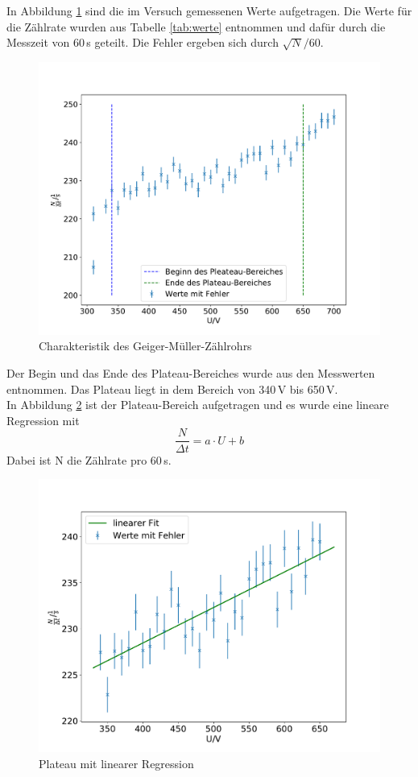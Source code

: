 In Abbildung \ref{fig:char} sind die im Versuch gemessenen Werte aufgetragen.
Die Werte für die Zählrate wurden aus Tabelle \ref{tab:werte} entnommen
und dafür durch die Messzeit von 60\,s geteilt.
Die Fehler ergeben sich durch $\sqrt{N}/60$.\\
\begin{figure}
  \centering
  \includegraphics[scale=0.7]{plateau.pdf}
  \caption{Charakteristik des Geiger-Müller-Zählrohrs}
  \label{fig:char}
\end{figure}
Der Begin und das Ende des Plateau-Bereiches wurde aus den Messwerten entnommen.
Das Plateau liegt in dem Bereich von 340\,V bis 650\,V.\\
In Abbildung \ref{fig:plateau} ist der Plateau-Bereich aufgetragen und es wurde eine lineare Regression mit
\begin{equation*}
\frac{N}{\Delta t} = a\cdot U + b
\end{equation*}
Dabei ist N die Zählrate pro 60\,s.
\begin{figure}
  \centering
  \includegraphics[scale=0.7]{plateau2.pdf}
  \caption{Plateau mit linearer Regression}
  \label{fig:plateau}
\end{figure}
